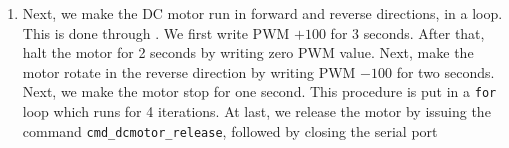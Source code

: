 \begin{enumerate}
  \item Next, we make the DC motor run in forward and reverse
        directions, in a loop.  This is done through
        .  We first write PWM $+100$ for 3
        seconds.  After that, halt the motor for 2 seconds by writing zero PWM value.  
        Next, make the motor rotate in the reverse direction by writing PWM $-100$ for two seconds.  
        Next, we make the motor stop for one second. This procedure is put in a {\tt for} loop which runs for 4 iterations.
        At last, we release the motor by issuing the command {\tt cmd\_dcmotor\_release}, followed by closing the serial port
        
\end{enumerate}










